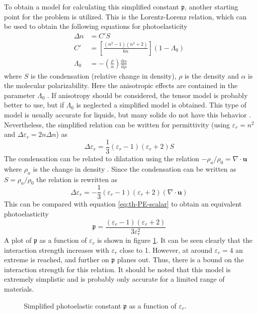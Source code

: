 \documentclass[11pt,twoside]{eitExjobb}
\begin{document}
	To obtain a model for calculating this simplified constant $\mathfrak{p}$, another starting point for the problem is utilized. This is the Lorentz-Lorenz relation, which can be used to obtain the following equations for photoelasticity \cite{Korpel1988}
	\begin{align*}
		\Delta n &= C' S \\
		C' &= \left[ \frac{(n^2-1)(n^2+2)}{6n} \right](1-\Lambda_0) \\
		\Lambda_0 &= -\left( \frac{\rho}{\alpha} \right) \frac{\mathrm{d} \alpha}{\mathrm{d} \rho}
	\end{align*}
	where $S$ is the condensation (relative change in density), $\rho$ is the density and $\alpha$ is the molecular polarizability. Here the anisotropic effects are contained in the parameter $\Lambda_0$ \cite{Korpel1988}. If anisotropy should be considered, the tensor model is probably better to use, but if $\Lambda_0$ is neglected a simplified model is obtained. This type of model is usually accurate for liquids, but many solids do not have this behavior \cite{Korpel1988}. Nevertheless, the simplified relation can be written for permittivity (using $\varepsilon_r = n^2$ and $\Delta \varepsilon_r = 2n \Delta n$) as
	\begin{equation*}
		\Delta \varepsilon_r = \frac{1}{3} (\varepsilon_r - 1)(\varepsilon_r + 2) S
	\end{equation*}
	The condensation can be related to dilatation using the relation $-\rho_a/\rho_0 = \nabla \cdot \bm{u}$ where $\rho_a$ is the change in density \cite{Kaufman2000}. Since the condensation can be written as $S = \rho_a/\rho_0$ \cite{Korpel1988} the relation is rewritten as
	\begin{equation*}
		\Delta \varepsilon_r = -\frac{1}{3} (\varepsilon_r - 1)(\varepsilon_r + 2) (\nabla \cdot \bm{u})
	\end{equation*}
	This can be compared with equation \eqref{eq:th-PE-scalar} to obtain an equivalent photoelasticity
	\begin{equation}
		\mathfrak{p} = \frac{(\varepsilon_r - 1)(\varepsilon_r + 2)}{3\varepsilon_r^2}
		\label{eq:th-PE-liquid-model}
	\end{equation}
	A plot of $\mathfrak{p}$ as a function of $\varepsilon_r$ is shown in figure \ref{fig:photoelastic-liquid}. It can be seen clearly that the interaction strength increases with $\varepsilon_r$ close to 1. However, at around $\varepsilon_r = 4$ an extreme is reached, and further on $\mathfrak{p}$ planes out. Thus, there is a bound on the interaction strength for this relation. It should be noted that this model is extremely simplistic and is probably only accurate for a limited range of materials.
	\begin{figure}[h]
		\centering
		
		\caption{\label{fig:photoelastic-liquid} Simplified photoelastic constant $\mathfrak{p}$ as a function of $\varepsilon_r$.}
	\end{figure}
	
\end{document}
